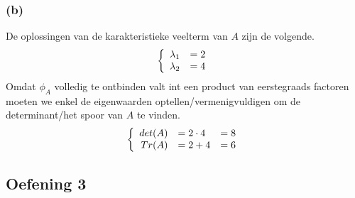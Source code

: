 \documentclass[lineaire_algebra_oplossingen.tex]{subfiles}
\begin{document}
\subsubsection*{(b)}
De oplossingen van de karakteristieke veelterm van $A$ zijn de volgende.
\[
\left\{
\begin{array}{c c}
\lambda_1 &= 2\\
\lambda_2 &= 4\\
\end{array}
\right.
\]
Omdat $\phi_{A}$ volledig te ontbinden valt int een product van eerstegraads factoren moeten we enkel de eigenwaarden optellen/vermenigvuldigen om de determinant/het spoor van $A$ te vinden.
\[
\left\{
\begin{array}{r l l}
det(A) &= 2\cdot 4 &=  8\\
Tr(A) &= 2+4 &= 6\\
\end{array}
\right.
\]

\subsection{Oefening 3}
\end{document}
